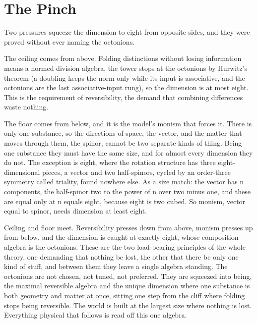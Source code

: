 \section{The Pinch}

Two pressures squeeze the dimension to eight from opposite sides, and they were proved without ever naming the octonions.

The ceiling comes from above. Folding distinctions without losing information means a normed division algebra, the tower stops at the octonions by Hurwitz's theorem (a doubling keeps the norm only while its input is associative, and the octonions are the last associative-input rung), so the dimension is at most eight. This is the requirement of reversibility, the demand that combining differences waste nothing.

The floor comes from below, and it is the model's monism that forces it. There is only one substance, so the directions of space, the vector, and the matter that moves through them, the spinor, cannot be two separate kinds of thing. Being one substance they must have the same size, and for almost every dimension they do not. The exception is eight, where the rotation structure has three eight-dimensional pieces, a vector and two half-spinors, cycled by an order-three symmetry called triality, found nowhere else. As a size match: the vector has n components, the half-spinor two to the power of n over two minus one, and these are equal only at n equals eight, because eight is two cubed. So monism, vector equal to spinor, needs dimension at least eight.

Ceiling and floor meet. Reversibility presses down from above, monism presses up from below, and the dimension is caught at exactly eight, whose composition algebra is the octonions. These are the two load-bearing principles of the whole theory, one demanding that nothing be lost, the other that there be only one kind of stuff, and between them they leave a single algebra standing. The octonions are not chosen, not tuned, not preferred. They are squeezed into being, the maximal reversible algebra and the unique dimension where one substance is both geometry and matter at once, sitting one step from the cliff where folding stops being reversible. The world is built at the largest size where nothing is lost. Everything physical that follows is read off this one algebra.
